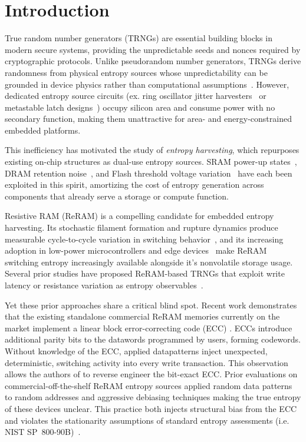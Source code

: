 \section{Introduction}

True random number generators (TRNGs) are essential building blocks in modern secure systems, providing the unpredictable seeds and nonces required by cryptographic protocols. Unlike pseudorandom number generators, TRNGs derive randomness from physical entropy sources whose unpredictability can be grounded in device physics rather than computational assumptions~\cite{stipcevic2014true}. However, dedicated entropy source circuits (ex. ring oscillator jitter harvesters~\cite{sunar2007provably} or metastable latch designs~\cite{tokunaga2008true}) occupy silicon area and consume power with no secondary function, making them unattractive for area- and energy-constrained embedded platforms.

This inefficiency has motivated the study of \emph{entropy harvesting}, which repurposes existing on-chip structures as dual-use entropy sources. SRAM power-up states~\cite{holcomb2009power}, DRAM retention noise~\cite{kim2019d}, and Flash threshold voltage variation~\cite{wang2012flash} have each been exploited in this spirit, amortizing the cost of entropy generation across components that already serve a storage or compute function.

Resistive RAM (ReRAM) is a compelling candidate for embedded entropy harvesting. Its stochastic filament formation and rupture dynamics produce measurable cycle-to-cycle variation in switching behavior~\cite{yu2016resistive, balatti2015true}, and its increasing adoption in low-power microcontrollers and edge devices~\cite{ramxeedreramproducts, nuvoton_rram} make ReRAM switching entropy increasingly available alongside it's nonvolatile storage usage. Several prior studies have proposed ReRAM-based TRNGs that exploit write latency or resistance variation as entropy observables~\cite{huang2012contact, jiang2017novel, wei2016true, pang2019memristors, tolga2024trng}.

Yet these prior approaches share a critical blind spot. Recent work demonstrates that the existing standalone commercial ReRAM memories currently on the market implement a linear block error-correcting code (ECC) \cite{sheaves2026brewrc}. ECCs introduce additional parity bits to the datawords programmed by users, forming codewords. Without knowledge of the ECC, applied datapatterns inject unexpected, deterministic, switching activity into every write transaction. This observation allows the authors of \cite{sheaves2026brewrc} to reverse engineer the bit-exact ECC. Prior evaluations on commercial-off-the-shelf ReRAM entropy sources applied random data patterns to random addresses and aggressive debiasing techniques making the true entropy of these devices unclear. This practice both injects structural bias from the ECC and violates the stationarity assumptions of standard entropy assessments (i.e. NIST SP~800-90B)~\cite{sonmez2016recommendation}.

